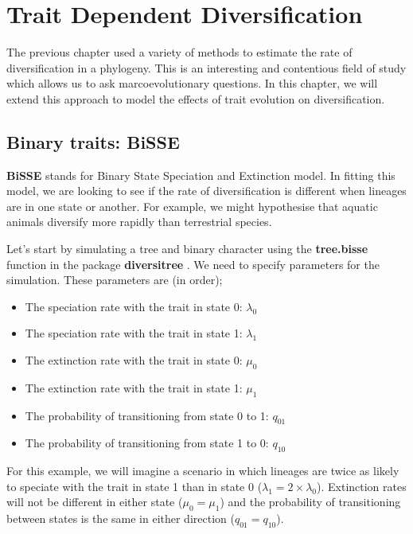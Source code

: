 \documentclass[
]{book}
\providecommand{\tightlist}{%
  \setlength{\itemsep}{0pt}\setlength{\parskip}{0pt}}
\begin{document}
\hypertarget{diversification2}{%
\chapter{Trait Dependent Diversification}\label{diversification2}}

The previous chapter used a variety of methods to estimate the rate of diversification in a phylogeny. This is an interesting and contentious field of study which allows us to ask marcoevolutionary questions. In this chapter, we will extend this approach to model the effects of trait evolution on diversification.

\hypertarget{binary-traits-bisse}{%
\section{Binary traits: BiSSE}\label{binary-traits-bisse}}

\textbf{BiSSE} stands for Binary State Speciation and Extinction model. In fitting this model, we are looking to see if the rate of diversification is different when lineages are in one state or another. For example, we might hypothesise that aquatic animals diversify more rapidly than terrestrial species.

Let's start by simulating a tree and binary character using the \textbf{tree.bisse} function in the package \textbf{diversitree} \citep{diversitree}. We need to specify parameters for the simulation. These parameters are (in order);

\begin{itemize}
\tightlist
\item
  The speciation rate with the trait in state 0: \(\lambda_{0}\)
\item
  The speciation rate with the trait in state 1: \(\lambda_{1}\)
\item
  The extinction rate with the trait in state 0: \(\mu_{0}\)
\item
  The extinction rate with the trait in state 1: \(\mu_{1}\)
\item
  The probability of transitioning from state 0 to 1: \(q_{01}\)
\item
  The probability of transitioning from state 1 to 0: \(q_{10}\)
\end{itemize}

For this example, we will imagine a scenario in which lineages are twice as likely to speciate with the trait in state 1 than in state 0 (\(\lambda_{1} = 2 \times\lambda_{0}\)). Extinction rates will not be different in either state (\(\mu_{0} = \mu_{1}\)) and the probability of transitioning between states is the same in either direction (\(q_{01} = q_{10}\)).
\end{document}

